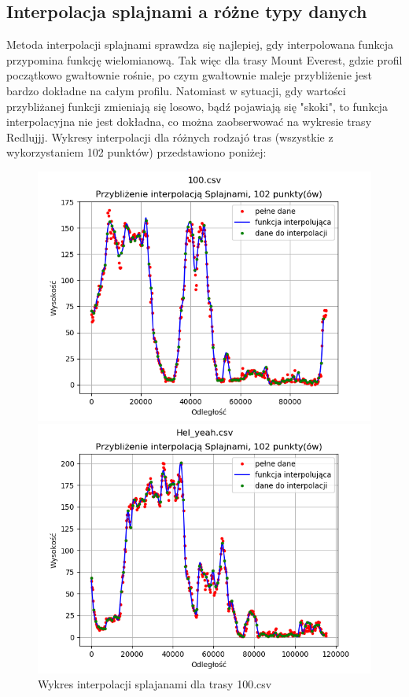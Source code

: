 \documentclass{article} %
\begin{document}
\newpage
\subsection{Interpolacja splajnami a różne typy danych}
Metoda interpolacji splajnami sprawdza się najlepiej, gdy interpolowana funkcja
przypomina funkcję wielomianową. Tak więc dla trasy Mount Everest, gdzie profil
początkowo gwałtownie rośnie, po czym gwałtownie maleje przybliżenie jest bardzo
dokładne na całym profilu. Natomiast w sytuacji, gdy wartości przybliżanej funkcji 
zmieniają się losowo, bądź pojawiają się "skoki", to funkcja interpolacyjna nie jest dokładna,
co można zaobserwować na wykresie trasy Redlujjj. Wykresy interpolacji dla różnych
rodzajó tras (wszystkie z wykorzystaniem 102 punktów) przedstawiono poniżej:
\begin{figure}[h!]
    \center
    \begin{minipage}[b]{0.4\textwidth}
        \includegraphics[width=\textwidth]{splajny/rozne_trasy/100_102.png}
        \caption{Wykres interpolacji splajanami dla trasy 100.csv}
    \end{minipage}
    \hfill
    \begin{minipage}[b]{0.4\textwidth}
        \includegraphics[width=\textwidth]{splajny/rozne_trasy/hy_102.png}

\end{minipage}
\end{figure}
\end{document}
